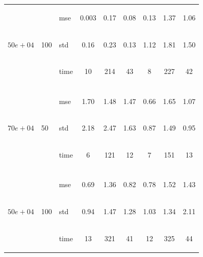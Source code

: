\documentclass{article} %
\newcommand{\efoo}{\end{footnotesize}}
\newcommand{\bfoo}{\begin{footnotesize}}
\begin{document}
\begin{table}[t]
\begin{center}
\begin{small}
\begin{sc}
\begin{tabular}{lllcccccc}
\\
\multirow{3}{*}{$50e+04$}&\multirow{3}{*}{100}&\bfoo mse\efoo&0.003&0.17&0.08&0.13&1.37&1.06\\
&&\bfoo std\efoo &0.16&0.23&0.13&1.12&1.81&1.50\\
&&\bfoo time\efoo &10&214&43&8&227&42\\

\\
\multirow{3}{*}{$70e+04$}&\multirow{3}{*}{50}&\bfoo mse\efoo&1.70&1.48&1.47&0.66&1.65&1.07\\
&&\bfoo std\efoo &2.18&2.47&1.63&0.87&1.49&0.95\\
&&\bfoo time\efoo &6&121&12&7&151&13\\

\\
\multirow{3}{*}{$50e+04$}&\multirow{3}{*}{100}&\bfoo mse\efoo&0.69&1.36&0.82&0.78&1.52&1.43\\
&&\bfoo std\efoo &0.94&1.47&1.28&1.03&1.34&2.11\\
&&\bfoo time\efoo &13&321&41&12&325&44\\

 \hline
\end{tabular}
\end{sc}
\end{small}
\end{center}
\vskip -0.1in
\end{table}
\end{document}
